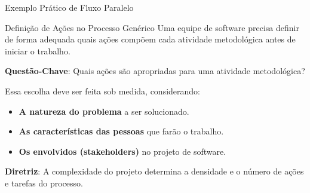 \documentclass[9pt]{beamer}
\begin{document}
\begin{frame}{Exemplo Prático de Fluxo Paralelo}
\end{frame}

\begin{frame}{Definição de Ações no Processo Genérico}
  Uma equipe de software precisa definir de forma adequada quais ações compõem cada atividade metodológica antes de iniciar o trabalho.

  \vspace{0.4cm}
  \textbf{Questão-Chave}: Quais ações são apropriadas para uma atividade metodológica?
  
  \vspace{0.3cm}
  Essa escolha deve ser feita sob medida, considerando:
  \begin{itemize}
    \item \textbf{A natureza do problema} a ser solucionado.
    \item \textbf{As características das pessoas} que farão o trabalho.
    \item \textbf{Os envolvidos (stakeholders)} no projeto de software.
  \end{itemize}

  \vspace{0.4cm}
  \centering
  \colorbox{blue!5}{
    \parbox{0.9\textwidth}{
      \scriptsize
      \textbf{Diretriz}: A complexidade do projeto determina a densidade e o número de ações e tarefas do processo.
    }
  }
\end{frame}
\end{document}
